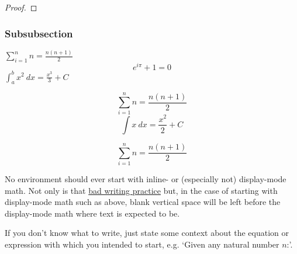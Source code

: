 \begin{proof}
    \lipsum[1]
\end{proof}

\begin{coro}
    \lipsum[][1-4]
\end{coro}

\begin{exrc}
    \lipsum[1]
\end{exrc}

\begin{soln}
    \lipsum[1]
\end{soln}

\subsubsection{Subsubsection}

\begin{defn}
    \lipsum[][1] \(\sum_{i=1}^{n} n = \frac{n(n+1)}{2}\) \lipsum[][2-3]
    \[e^{i\pi}+1 = 0\]
    \lipsum[][4] \(\int_{a}^{b} x^2 \ dx = \frac{x^3}{3} + C\) \lipsum[][5-6]
\end{defn}

\begin{nota}
    \lipsum[][1-3]
    \[\sum_{i=1}^{n} n = \frac{n(n+1)}{2}\]
    \lipsum[][4-5]
    \[\int x \ dx = \frac{x^2}{2} + C\]
    \lipsum[][6-7]
\end{nota}

\begin{defn}
    \[\sum_{i=1}^{n} n = \frac{n(n+1)}{2}\]
    \lipsum[][3-5]
\end{defn}

\begin{rmrk}
    No environment should ever start with inline- or (especially not) display-mode math. Not only is that \href{https://kconrad.math.uconn.edu/blurbs/proofs/writingtips.pdf}{bad writing practice} but, in the case of starting with display-mode math such as above, blank vertical space will be left before the display-mode math where text is expected to be.

    If you don't know what to write, just state some context about the equation or expression with which you intended to start, e.g. `Given any natural number \(n\):'.
\end{rmrk}

